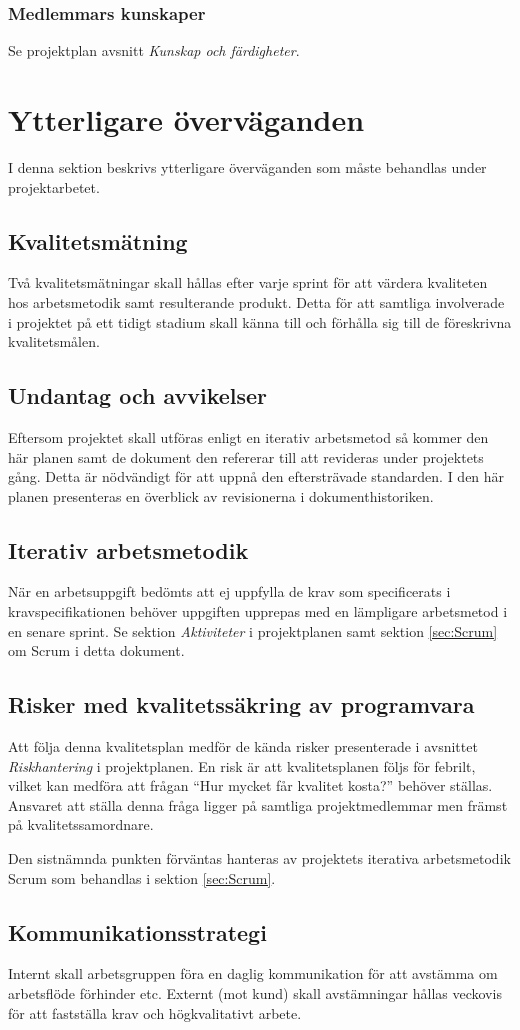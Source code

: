 \documentclass[a4paper,10pt]{article}
\begin{document}
\subsubsection{Medlemmars kunskaper}
Se projektplan avsnitt \emph{Kunskap och färdigheter}.

\section{Ytterligare överväganden}
I denna sektion beskrivs ytterligare överväganden som måste behandlas under projektarbetet.
\subsection{Kvalitetsmätning}
\label{sec:Kvalitetsmatning}
Två kvalitetsmätningar skall hållas efter varje sprint för att värdera kvaliteten hos arbetsmetodik samt resulterande produkt.
Detta för att samtliga involverade i projektet på ett tidigt stadium skall känna till och förhålla sig till de föreskrivna kvalitetsmålen.

\subsection{Undantag och avvikelser}

Eftersom projektet skall utföras enligt en iterativ arbetsmetod så kommer den här planen samt de dokument den refererar till att revideras under projektets gång. Detta är nödvändigt för att uppnå den eftersträvade standarden. I den här planen presenteras en överblick av revisionerna i dokumenthistoriken.

\subsection{Iterativ arbetsmetodik}
När en arbetsuppgift bedömts att ej uppfylla de krav som specificerats i kravspecifikationen behöver uppgiften upprepas med en lämpligare arbetsmetod i en senare sprint. Se sektion \emph{Aktiviteter} i projektplanen samt sektion \ref{sec:Scrum} om Scrum i detta dokument.

\subsection{Risker med kvalitetssäkring av programvara}
Att följa denna kvalitetsplan medför de kända risker presenterade i avsnittet \emph{Riskhantering} i projektplanen. En risk är att kvalitetsplanen följs för febrilt, vilket kan medföra att frågan “Hur mycket får kvalitet kosta?” behöver ställas. Ansvaret att ställa denna fråga ligger på samtliga projektmedlemmar men främst på kvalitetssamordnare.

Den sistnämnda punkten förväntas hanteras av projektets iterativa arbetsmetodik Scrum som behandlas i sektion \ref{sec:Scrum}.

\subsection{Kommunikationsstrategi}
Internt skall arbetsgruppen föra en daglig kommunikation för att avstämma om arbetsflöde förhinder etc.
Externt (mot kund) skall avstämningar hållas veckovis för att fastställa krav och högkvalitativt arbete.
\end{document}
